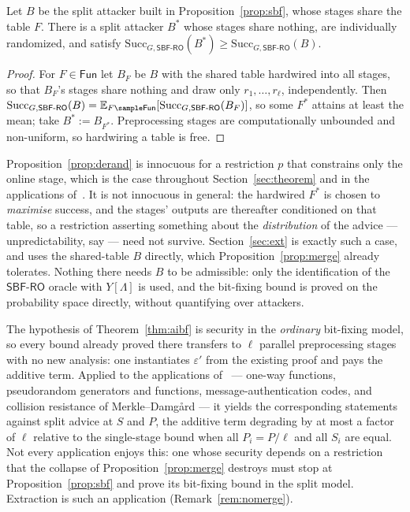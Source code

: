 \documentclass{conjura-conjecture}
\newcommand{\Fun}{\mathsf{Fun}}
\newcommand{\Succ}{\mathrm{Succ}}
\newcommand{\Exp}{\mathbb{E}}
\newcommand{\SBF}{\mathsf{SBF\text{-}RO}}
\begin{document}
\begin{proposition}\label{prop:derand}
Let $B$ be the split attacker built in Proposition~\ref{prop:sbf}, whose
stages share the table $F$. There is a split attacker $B^{*}$ whose stages
share nothing, are individually randomized, and satisfy
$\Succ_{G,\SBF}(B^{*}) \ge \Succ_{G,\SBF}(B)$.
\end{proposition}

\begin{proof}
For $F \in \Fun$ let $B_F$ be $B$ with the shared table hardwired into all
stages, so that $B_F$'s stages share nothing and draw only
$r_1,\dots,r_\ell$, independently. Then $\Succ_{G,\SBF}(B) =
\Exp_{F \sample \Fun}[\Succ_{G,\SBF}(B_F)]$, so some $F^{*}$ attains at
least the mean; take $B^{*} := B_{F^{*}}$. Preprocessing stages are
computationally unbounded and non-uniform, so hardwiring a table is free.
\end{proof}

\begin{remark}\label{rem:derandcost}
Proposition~\ref{prop:derand} is innocuous for a restriction $p$ that
constrains only the online stage, which is the case throughout
Section~\ref{sec:theorem} and in the applications
of~\cite[\S\S3--4]{CDGS}. It is not innocuous in general: the hardwired
$F^{*}$ is chosen to \emph{maximise} success, and the stages' outputs are
thereafter conditioned on that table, so a restriction asserting something
about the \emph{distribution} of the advice --- unpredictability, say ---
need not survive. Section~\ref{sec:ext} is exactly such a case, and uses
the shared-table $B$ directly, which Proposition~\ref{prop:merge} already
tolerates. Nothing there needs $B$ to be admissible: only the
identification of the $\SBF$ oracle with $Y[\Lambda]$ is used, and the
bit-fixing bound is proved on the probability space directly, without
quantifying over attackers.
\end{remark}

\begin{remark}\label{rem:payoff}
The hypothesis of Theorem~\ref{thm:aibf} is security in the
\emph{ordinary} bit-fixing model, so every bound already proved there
transfers to $\ell$ parallel preprocessing stages with no new analysis:
one instantiates $\varepsilon'$ from the existing proof and pays the
additive term. Applied to the applications of~\cite[\S\S3--4]{CDGS} ---
one-way functions, pseudorandom generators and functions,
message-authentication codes, and collision resistance of
Merkle--Damg\aa{}rd --- it yields the corresponding statements against
split advice at $S$ and $P$, the additive term degrading by at most a
factor of $\ell$ relative to the single-stage bound when all
$P_i = P/\ell$ and all $S_i$ are equal. Not every application enjoys this:
one whose security depends on a restriction that the collapse of
Proposition~\ref{prop:merge} destroys must stop at
Proposition~\ref{prop:sbf} and prove its bit-fixing bound in the split
model. Extraction is such an application (Remark~\ref{rem:nomerge}).
\end{remark}
\end{document}
